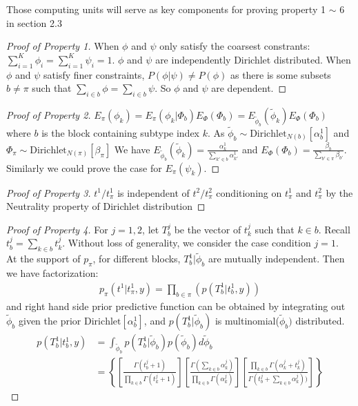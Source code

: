 \documentclass[aoas,preprint]{imsart}
\begin{document}
Those computing units will serve as key components for proving property 1 $\sim$ 6 in section 2.3

\begin{proof}[Proof of Property 1]
When $\phi$ and $\psi$ only satisfy the coarsest constrants: $\sum_{i = 1}^K \phi_i = \sum_{i = 1}^K \psi_i = 1$. $\phi$ and $\psi$ are independently Dirichlet distributed.
When $\phi$ and $\psi$ satisfy finer constraints, $P(\phi | \psi ) \neq P(\phi)$ as there is some subsets $b \neq \pi$ such that $\sum_{i\in b} \phi = \sum_{i \in b} \psi$. So $\phi$ and $\psi$ are dependent.
\end{proof}

\begin{proof}[Proof of Property 2]
$E_{\pi}(\phi_k) = E_{\pi}(\phi_k | \Phi_b) E_{\Phi}(\Phi_b) = E_{\tilde{\phi}_b}(\tilde{\phi}_k)E_{\Phi}(\Phi_b)$ where $b$ is the block containing subtype index $k$. As $\tilde{\phi}_b \sim  \text{Dirichlet}_{N(b)}[ \alpha_b^1 ]$ and  $\Phi_\pi  \sim \text{Dirichlet}_{N(\pi)}[   \beta_\pi   ] $
We have $E_{\tilde{\phi}_b}(\tilde{\phi}_k) =  \frac{ \alpha^1_k }{ \sum_{k' \in b} \alpha^1_{k'} } $ and $E_{\Phi}(\Phi_b) = \frac{ \beta_b }{ \sum_{b' \in \pi} \beta_{b'} } $. Similarly we could prove the case for $E_{\pi}(\psi_k)$.
\end{proof}

\begin{proof}[Proof of Property 3]
$t^1 / t_{\pi}^1$ is independent of $t^2 / t_{\pi}^2$ conditioning on $t_\pi^1$ and $t_\pi^2$ by the Neutrality property of Dirichlet distribution
\end{proof}

\begin{proof}[Proof of Property 4]
For $j = 1,2$,
let $T_b^j$ be the vector of $t_k^j$ such that $k \in b$. Recall $t_b^j = \sum_{k \in b} t_k^j$.
Without loss of generality, we consider the case condition $j = 1$.\\
At the support of $p_\pi$, for different blocks, $T_b^1 | \tilde \phi_b$ are mutually independent. Then we have factorization:
\begin{eqnarray*}
p_\pi(t^1 | t_\pi^1, y) = \prod_{b\in \pi}(p(T_b^1 | t_b^1,y) )
\end{eqnarray*}
and right hand side prior predictive function can be obtained by integrating out $ \tilde{\phi}_b$ given the prior $\text{Dirichlet} [ \alpha_b^1]$, and  $p(T_b^1  | \tilde{\phi}_b)$ is multinomial($\tilde{\phi}_b)$ distributed.
\begin{align*}
p(T_b^1  | t_b^1,y) &= \int_{\tilde{\phi}_b} p(T_b^1  | \tilde{\phi}_b) p(\tilde{\phi}_b) d\tilde{\phi}_b\\
                                      &= \left\{\left[ \frac{ \Gamma(t^j_b +1 ) }{\prod_{k \in b} \Gamma( t^j_k + 1 ) }\right]
\left[ \frac{\Gamma( \sum_{k \in b} \alpha_k^j )}{
		\prod_{k\in b} \Gamma( \alpha_k^j ) } \right] 
       \left[        \frac{ \prod_{k \in b} \Gamma(\alpha_k^j + t^j_k)  }{
		\Gamma(t^j_b + \sum_{k\in b} \alpha_k^j ) )}\right]\right\}
\end{align*}
\end{proof}
\end{document}
